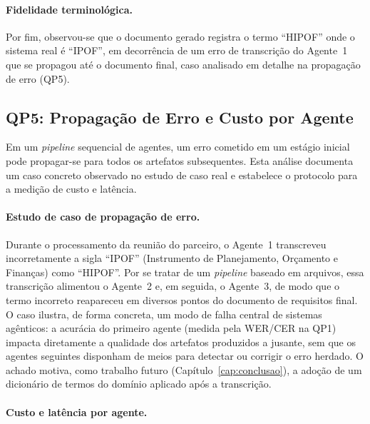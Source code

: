 \paragraph{Fidelidade terminológica.}
Por fim, observou-se que o documento gerado registra o termo ``HIPOF'' onde o sistema real é ``IPOF'', em decorrência de um erro de transcrição do Agente~1 que se propagou até o documento final, caso analisado em detalhe na propagação de erro (QP5).


\subsection{QP5: Propagação de Erro e Custo por Agente}

Em um \textit{pipeline} sequencial de agentes, um erro cometido em um estágio inicial pode propagar-se para todos os artefatos subsequentes. Esta análise documenta um caso concreto observado no estudo de caso real e estabelece o protocolo para a medição de custo e latência.

\paragraph{Estudo de caso de propagação de erro.}
Durante o processamento da reunião do parceiro, o Agente~1 transcreveu incorretamente a sigla ``IPOF'' (Instrumento de Planejamento, Orçamento e Finanças) como ``HIPOF''. Por se tratar de um \textit{pipeline} baseado em arquivos, essa transcrição alimentou o Agente~2 e, em seguida, o Agente~3, de modo que o termo incorreto reapareceu em diversos pontos do documento de requisitos final. O caso ilustra, de forma concreta, um modo de falha central de sistemas agênticos: a acurácia do primeiro agente (medida pela WER/CER na QP1) impacta diretamente a qualidade dos artefatos produzidos a jusante, sem que os agentes seguintes disponham de meios para detectar ou corrigir o erro herdado. O achado motiva, como trabalho futuro (Capítulo~\ref{cap:conclusao}), a adoção de um dicionário de termos do domínio aplicado após a transcrição.

\paragraph{Custo e latência por agente.}

